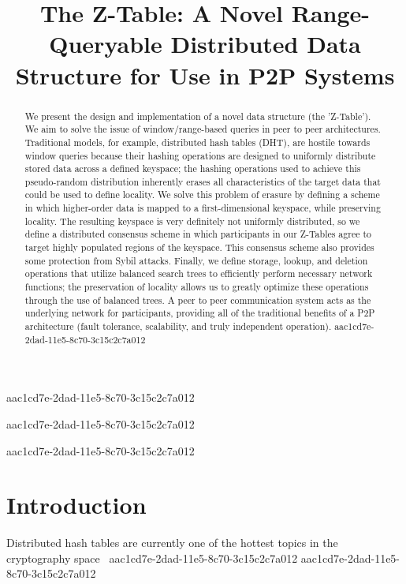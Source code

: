 \documentclass[12pt]{article}
\title{The Z-Table: A Novel Range-Queryable Distributed Data Structure for Use in P2P Systems}
\begin{document}
aac1cd7e-2dad-11e5-8c70-3c15c2c7a012
\maketitle

aac1cd7e-2dad-11e5-8c70-3c15c2c7a012\begin{abstract}
We present the design and implementation of a novel data structure (the 'Z-Table'). We aim to solve the issue of window/range-based queries in peer to peer architectures. Traditional models, for example,  distributed hash tables (DHT), are hostile towards window queries because their hashing operations are designed to uniformly distribute stored data across a defined keyspace; the hashing operations used to achieve this pseudo-random distribution inherently erases all characteristics of the target data that could be used to define locality. We solve this problem of erasure by defining a scheme in which higher-order data is mapped to a first-dimensional keyspace, while preserving locality. The resulting keyspace is very definitely not uniformly distributed, so we define a distributed consensus scheme in which participants in our Z-Tables agree to target highly populated regions of the keyspace. This consensus scheme also provides some protection from Sybil attacks. Finally, we define storage, lookup, and deletion operations that utilize balanced search trees to efficiently perform necessary network functions; the preservation of locality allows us to greatly optimize these operations through the use of balanced trees. A peer to peer communication system acts as the underlying network for participants, providing all of the traditional benefits of a P2P architecture (fault tolerance, scalability, and truly independent operation).
aac1cd7e-2dad-11e5-8c70-3c15c2c7a012\end{abstract}


\newpage
aac1cd7e-2dad-11e5-8c70-3c15c2c7a012\section{Introduction}
Distributed hash tables are currently one of the hottest topics in the cryptography space~\cite{Stoica:2001dj,Rowstron:2001ea,Ratnasamy:2001wn}
aac1cd7e-2dad-11e5-8c70-3c15c2c7a012
aac1cd7e-2dad-11e5-8c70-3c15c2c7a012\printbibliography
\end{document}
